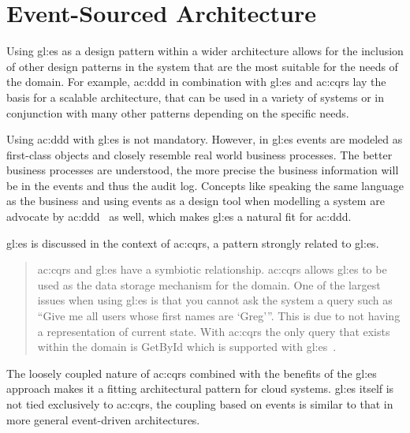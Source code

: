 
\section{Event-Sourced Architecture}\label{sec:esa}

Using \gls{gl:es} as a design pattern within a wider architecture allows for the inclusion of other design patterns in the system that are the most suitable for the needs of the domain. For example, \gls{ac:ddd} in combination with \gls{gl:es} and \gls{ac:cqrs} lay the basis for a scalable architecture, that can be used in a variety of systems or in conjunction with many other patterns depending on the specific needs.


Using \gls{ac:ddd} with \gls{gl:es} is not mandatory. However, in \gls{gl:es} events are modeled as first-class objects and closely resemble real world business processes. The better business processes are understood, the more precise the business information will be in the events and thus the audit log. Concepts like speaking the same language as the business and using events as a design tool when modelling a system are advocate by \gls{ac:ddd}~\citep{evans2004domain} as well, which makes \gls{gl:es} a natural fit for \gls{ac:ddd}.


\gls{gl:es} is discussed in the context of \gls{ac:cqrs}, a pattern strongly related to \gls{gl:es}.

\begin{quote}
\gls{ac:cqrs} and \gls{gl:es} have a symbiotic relationship. \gls{ac:cqrs} allows \gls{gl:es} to be used as the
data storage mechanism for the domain. One of the largest issues when using \gls{gl:es} is that you
cannot ask the system a query such as “Give me all users whose first names are ‘Greg’”. This is due to
not having a representation of current state. With \gls{ac:cqrs} the only query that exists within the domain is
GetById which is supported with \gls{gl:es}~\citep{young2010cqrs}.
\end{quote}

The loosely coupled nature of \gls{ac:cqrs} combined with the benefits of the \gls{gl:es} approach makes it a fitting architectural pattern for cloud systems. \gls{gl:es} itself is not tied exclusively to \gls{ac:cqrs}, the coupling based on events is similar to that in more general event-driven architectures.

